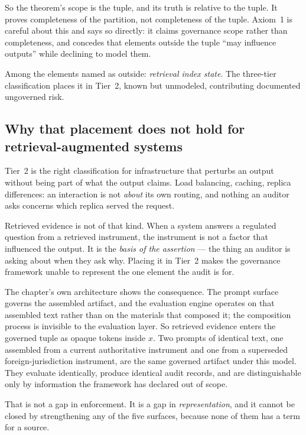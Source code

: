 So the theorem's scope is the tuple, and its truth is relative to the tuple. It proves
completeness of the partition, not completeness of the tuple. Axiom~1 is careful about
this and says so directly: it claims governance scope rather than completeness, and
concedes that elements outside the tuple ``may influence outputs'' while declining to
model them.

Among the elements named as outside: \emph{retrieval index state}. The three-tier
classification places it in Tier~2, known but unmodeled, contributing documented
ungoverned risk.

\subsection{Why that placement does not hold for retrieval-augmented systems}

Tier~2 is the right classification for infrastructure that perturbs an output without
being part of what the output claims. Load balancing, caching, replica differences: an
interaction is not \emph{about} its own routing, and nothing an auditor asks concerns
which replica served the request.

Retrieved evidence is not of that kind. When a system answers a regulated question from
a retrieved instrument, the instrument is not a factor that influenced the output. It is
the \emph{basis of the assertion} --- the thing an auditor is asking about when they ask
why. Placing it in Tier~2 makes the governance framework unable to represent the one
element the audit is for.

The chapter's own architecture shows the consequence. The prompt surface governs the
assembled artifact, and the evaluation engine operates on that assembled text rather
than on the materials that composed it; the composition process is invisible to the
evaluation layer. So retrieved evidence enters the governed tuple as opaque tokens
inside $x$. Two prompts of identical text, one assembled from a current authoritative
instrument and one from a superseded foreign-jurisdiction instrument, are the same
governed artifact under this model. They evaluate identically, produce identical audit
records, and are distinguishable only by information the framework has declared out of
scope.

That is not a gap in enforcement. It is a gap in \emph{representation}, and it cannot be
closed by strengthening any of the five surfaces, because none of them has a term for a
source.

